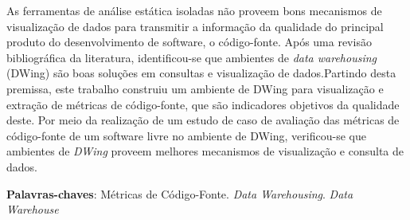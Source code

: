 \begin{resumo}

As ferramentas de análise estática isoladas não proveem bons mecanismos de visualização de dados para transmitir a informação da qualidade do principal produto do desenvolvimento de software, o código-fonte. Após uma revisão bibliográfica da literatura, identificou-se que ambientes de \textit{data warehousing} (DWing) são boas soluções em consultas e visualização de dados.Partindo desta premissa, este trabalho construiu um ambiente de DWing para visualização e extração de métricas de código-fonte, que são indicadores objetivos da qualidade deste. Por meio da realização de um estudo de caso de avaliação das métricas de código-fonte de um software livre no ambiente de DWing, verificou-se que ambientes de \textit{DWing} proveem melhores mecanismos de visualização e consulta de dados.


 \vspace{\onelineskip}
    
 \noindent
 \textbf{Palavras-chaves}: Métricas de Código-Fonte. \textit{Data Warehousing}. \textit{Data Warehouse}
\end{resumo}
